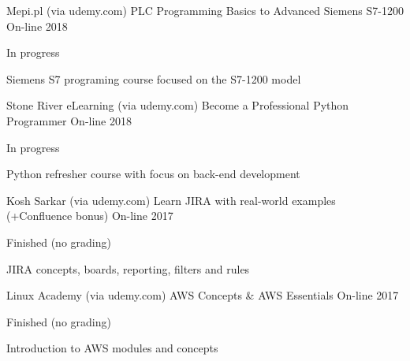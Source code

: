 

\begin{cventries}

  \cventry
    {Mepi.pl (via udemy.com)} %
    {PLC Programming Basics to Advanced Siemens S7-1200} %
    {On-line} %
    {2018} %
    {
      \begin{cvitems} %
        \item {In progress}
        \item {Siemens S7 programing course focused on the S7-1200 model}
      \end{cvitems}
    }

  \cventry
    {Stone River eLearning (via udemy.com)} %
    {Become a Professional Python Programmer} %
    {On-line} %
    {2018} %
    {
      \begin{cvitems} %
        \item {In progress}
        \item {Python refresher course with focus on back-end development}
      \end{cvitems}
    }

  \cventry
    {Kosh Sarkar (via udemy.com)} %
    {Learn JIRA with real-world examples (+Confluence bonus)} %
    {On-line} %
    {2017} %
    {
      \begin{cvitems} %
        \item {Finished (no grading)}
        \item {JIRA concepts, boards, reporting, filters and rules}
      \end{cvitems}
    }

  \cventry
    {Linux Academy (via udemy.com)} %
    {AWS Concepts \& AWS Essentials} %
    {On-line} %
    {2017} %
    {
      \begin{cvitems} %
        \item {Finished (no grading)}
        \item {Introduction to AWS modules and concepts}
      \end{cvitems}
    }


\end{cventries}
